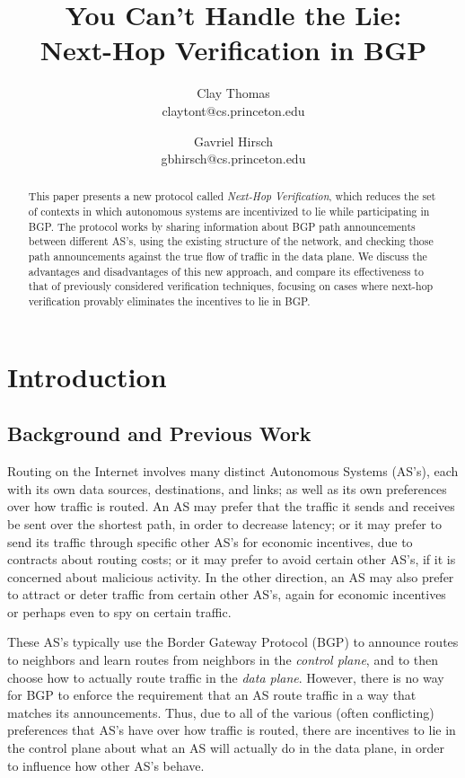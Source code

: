 \documentclass[pdftex,twoside,twocolumn,10pt,letterpaper]{article}
\title{\textbf{You Can't Handle the Lie: \\Next-Hop Verification in BGP}}
\author{Clay Thomas\\ claytont@cs.princeton.edu
  \and 
  Gavriel Hirsch\\ gbhirsch@cs.princeton.edu }
\date{}
\begin{document}
\maketitle

\begin{abstract}
  This paper presents a new protocol called \emph{Next-Hop Verification},
  which reduces the set of contexts in which
  autonomous systems are incentivized to lie while participating in BGP.
  The protocol works by sharing information about BGP path announcements
  between different AS's, using the existing structure of the network,
  and checking those path announcements against the true flow of traffic
  in the data plane.
  We discuss the advantages and disadvantages of this new approach,
  and compare its effectiveness to that of previously considered verification
  techniques, focusing on cases where next-hop verification provably eliminates
  the incentives to lie in BGP.
\end{abstract}

\section{Introduction}

  \subsection{Background and Previous Work}
    Routing on the Internet involves many distinct Autonomous Systems (AS's), each
    with its own data sources, destinations, and links; as well as its own
    preferences over how traffic is routed. An AS may prefer that the traffic it
    sends and receives be sent over the shortest path, in order to decrease
    latency; or it may prefer to send its traffic through specific
    other AS's for economic incentives, due to contracts about
    routing costs; or it may prefer to avoid certain other AS's, if it is
    concerned about malicious activity. In the other direction, an AS may also
    prefer to attract or deter traffic from certain other AS's, again for economic
    incentives or perhaps even to spy on certain traffic.

    These AS's typically use the Border Gateway Protocol (BGP) to announce
    routes to neighbors and learn routes from neighbors in the 
    \emph{control plane},
    and to then choose how to actually route traffic in the \emph{data plane}.
    However,
    there is no way for BGP to enforce the requirement that an AS route traffic in a
    way that matches its announcements.
    Thus, due to all of the various (often conflicting)
    preferences that AS's have over how traffic is routed,
    there are incentives to lie in the control plane about what an AS
    will actually do in the data plane, in order to influence how other AS's behave.
\end{document}
